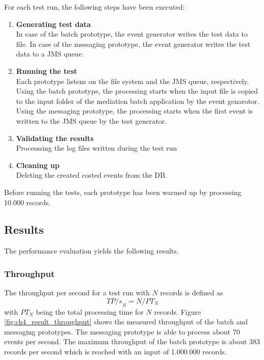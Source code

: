 For each test run, the following steps have been executed:
\begin{enumerate}
	\item \textbf{Generating test data}\\In case of the batch prototype, the event generator writes the test data to file. In case of the messaging prototype, the event generator writes the test data to a \ac{JMS} queue.
	\item \textbf{Running the test}\\Each prototype listens on the file system and the \ac{JMS} queue, respectively. Using the batch prototype, the processing starts when the input file is copied to the input folder of the mediation batch application by the event genarotor. Using the messaging prototype, the processing starts when the first event is written to the JMS queue by the test generator.
	\item \textbf{Validating the results}\\Processsing the log files written during the test run
	\item \textbf{Cleaning up}\\Deleting the created costed events from the DB.
\end{enumerate}

Before running the tests, each prototype has been warmed up by processing 10.000 records.

\subsection{Results} \label{sec:ch4_results}
The performance evaluation yields the following results.

\subsubsection{Throughput}

The throughput per second for a test run with $N$ records is defined as
\begin{displaymath}
{TP/s}_N = N / PT_N
\end{displaymath}
with $PT_N$ being the total processing time for $N$ records. 
Figure \ref{fig:ch4_result_throughput} shows the measured throughput of the batch and messaging prototypes. The messaging prototype is able to process about 70 events per second. The maximum throughput of the batch prototype is about 383 records per second which is reached with an input of 1.000.000 records.


